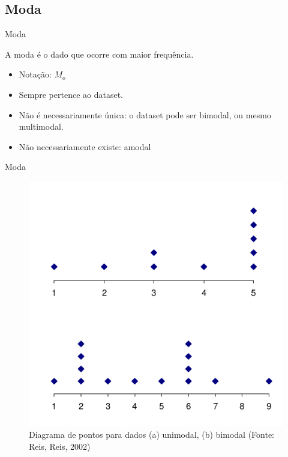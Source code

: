 \documentclass{beamer}
\begin{document}
\subsection{Moda}
\begin{frame}{Moda}
  \begin{definition}
    A moda é o dado que ocorre com \alert{maior frequência}.
  \end{definition}
  \begin{itemize}
  \item Notação: $M_o$
  \item Sempre pertence ao dataset.
  \item Não é necessariamente única: o dataset pode ser
    \alert{bimodal}, ou mesmo \alert{multimodal}.
  \item Não necessariamente existe: \alert{amodal}
  \end{itemize}
\end{frame}

\begin{frame}{Moda}
  \begin{figure}
    \centering
    \includegraphics[height=0.7\textheight]{moda}
    \caption{Diagrama de pontos para dados (a) unimodal, (b) bimodal
      (Fonte: Reis, Reis, 2002)}
  \end{figure}
\end{frame}
\end{document}
